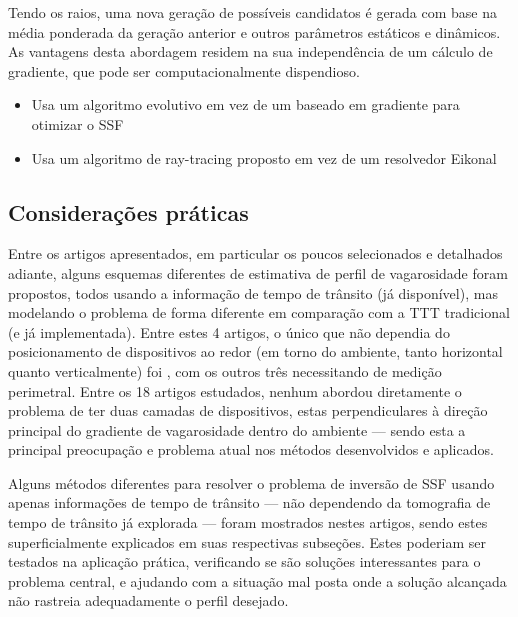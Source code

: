 Tendo os raios, uma nova geração de possíveis candidatos é gerada com base na média ponderada da geração anterior e outros parâmetros estáticos e dinâmicos. As vantagens desta abordagem residem na sua independência de um cálculo de gradiente, que pode ser computacionalmente dispendioso.

\begin{itemize}
	\item Usa um algoritmo evolutivo em vez de um baseado em gradiente para otimizar o SSF
	\item Usa um algoritmo de ray-tracing proposto em vez de um resolvedor Eikonal
\end{itemize}

\subsection{Considerações práticas}

Entre os artigos apresentados, em particular os poucos selecionados e detalhados adiante, alguns esquemas diferentes de estimativa de perfil de vagarosidade foram propostos, todos usando a informação de tempo de trânsito (já disponível), mas modelando o problema de forma diferente em comparação com a TTT tradicional (e já implementada). Entre estes 4 artigos, o único que não dependia do posicionamento de dispositivos ao redor (em torno do ambiente, tanto horizontal quanto verticalmente) foi \cite{yu_krylov_2021}, com os outros três necessitando de medição perimetral. Entre os 18 artigos estudados, nenhum abordou diretamente o problema de ter duas camadas de dispositivos, estas perpendiculares à direção principal do gradiente de vagarosidade dentro do ambiente --- sendo esta a principal preocupação e problema atual nos métodos desenvolvidos e aplicados.

Alguns métodos diferentes para resolver o problema de inversão de SSF usando apenas informações de tempo de trânsito --- não dependendo da tomografia de tempo de trânsito já explorada --- foram mostrados nestes artigos, sendo estes superficialmente explicados em suas respectivas subseções. Estes poderiam ser testados na aplicação prática, verificando se são soluções interessantes para o problema central, e ajudando com a situação mal posta onde a solução alcançada não rastreia adequadamente o perfil desejado.